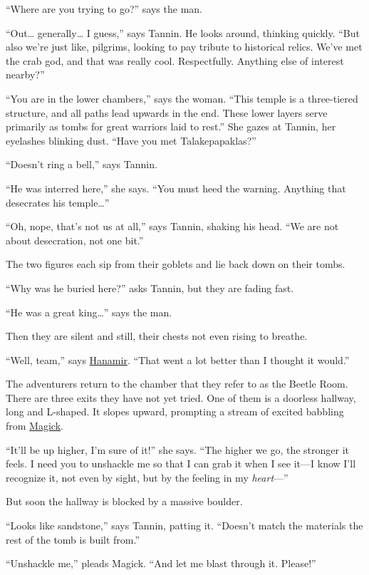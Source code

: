 \documentclass[smalldemyvopaper,11pt,twoside,onecolumn,openright,extrafontsizes]{memoir}
\begin{document}
``Where are you trying to go?'' says the man.

``Out\ldots{} generally\ldots{} I guess,'' says Tannin. He looks around,
thinking quickly. ``But also we're just like, pilgrims, looking to pay
tribute to historical relics. We've met the crab god, and that was
really cool. Respectfully. Anything else of interest nearby?''

``You are in the lower chambers,'' says the woman. ``This temple is a
three-tiered structure, and all paths lead upwards in the end. These
lower layers serve primarily as tombs for great warriors laid to rest.''
She gazes at Tannin, her eyelashes blinking dust. ``Have you met
Talakepapaklas?''

``Doesn't ring a bell,'' says Tannin.

``He was interred here,'' she says. ``You must heed the warning.
Anything that desecrates his temple\ldots{}''

``Oh, nope, that's not us at all,'' says Tannin, shaking his head. ``We
are not about desecration, not one bit.''

The two figures each sip from their goblets and lie back down on their
tombs.

``Why was he buried here?'' asks Tannin, but they are fading fast.

``He was a great king\ldots{}'' says the man.

Then they are silent and still, their chests not even rising to breathe.

``Well, team,'' says \href{/characters/hanamir/}{Hanamir}. ``That went a
lot better than I thought it would.''

The adventurers return to the chamber that they refer to as the Beetle
Room. There are three exits they have not yet tried. One of them is a
doorless hallway, long and L-shaped. It slopes upward, prompting a
stream of excited babbling from \href{/characters/magick/}{Magick}.

``It'll be up higher, I'm sure of it!'' she says. ``The higher we go,
the stronger it feels. I need you to unshackle me so that I can grab it
when I see it---I know I'll recognize it, not even by sight, but by the
feeling in my \emph{heart}---''

But soon the hallway is blocked by a massive boulder.

``Looks like sandstone,'' says Tannin, patting it. ``Doesn't match the
materials the rest of the tomb is built from.''

``Unshackle me,'' pleads Magick. ``And let me blast through it.
Please!''
\end{document}
